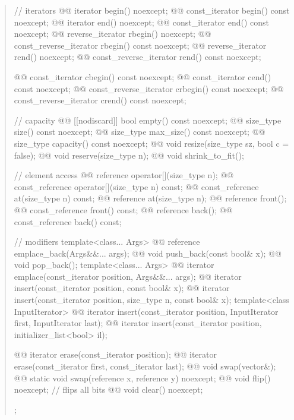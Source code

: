 \documentclass{wg21}
\begin{document}
\begin{quote}
\begin{codeblock}
{{    // iterators
    @@ iterator               begin() noexcept;
    @@ const_iterator         begin() const noexcept;
    @@ iterator               end() noexcept;
    @@ const_iterator         end() const noexcept;
    @@ reverse_iterator       rbegin() noexcept;
    @@ const_reverse_iterator rbegin() const noexcept;
    @@ reverse_iterator       rend() noexcept;
    @@ const_reverse_iterator rend() const noexcept;

    @@ const_iterator         cbegin() const noexcept;
    @@ const_iterator         cend() const noexcept;
    @@ const_reverse_iterator crbegin() const noexcept;
    @@ const_reverse_iterator crend() const noexcept;

    // capacity
    @@ [[nodiscard]] bool empty() const noexcept;
    @@ size_type size() const noexcept;
    @@ size_type max_size() const noexcept;
    @@ size_type capacity() const noexcept;
    @@ void      resize(size_type sz, bool c = false);
    @@ void      reserve(size_type n);
    @@ void      shrink_to_fit();

    // element access
    @@ reference       operator[](size_type n);
    @@ const_reference operator[](size_type n) const;
    @@ const_reference at(size_type n) const;
    @@ reference       at(size_type n);
    @@ reference       front();
    @@ const_reference front() const;
    @@ reference       back();
    @@ const_reference back() const;

    // modifiers
    template<class... Args> @@ reference emplace_back(Args&&... args);
    @@ void push_back(const bool& x);
    @@ void pop_back();
    template<class... Args> @@ iterator emplace(const_iterator position, Args&&... args);
    @@ iterator insert(const_iterator position, const bool& x);
    @@ iterator insert(const_iterator position, size_type n, const bool& x);
    template<class InputIterator>
      @@ iterator insert(const_iterator position, InputIterator first, InputIterator last);
    @@ iterator insert(const_iterator position, initializer_list<bool> il);

    @@ iterator erase(const_iterator position);
    @@ iterator erase(const_iterator first, const_iterator last);
    @@ void swap(vector&);
    @@ static void swap(reference x, reference y) noexcept;
    @@ void flip() noexcept;       // flips all bits
    @@ void clear() noexcept;
  };
}
\end{codeblock}%
\end{quote}
\end{document}
